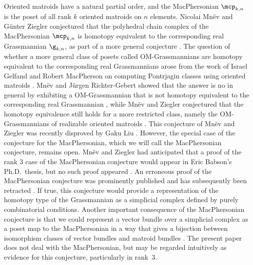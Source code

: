 Oriented matroids have a natural partial order, and the MacPhersonian $\mcp_{k,n}$ is the poset of all rank $k$ oriented matroids on $n$ elements.
Nicolai Mnëv and Günter Ziegler conjectured that the polyhedral chain complex of the MacPhersonian $\mcp_{k,n}$ is homotopy equivalent to the corresponding real Grassmannian $\g_{k,n}$, as part of a more general conjecture \cite{mnev1993combinatorial}.
The question of whether a more general class of posets called OM-Grassmannians are homotopy equivalent to the corresponding real Grassmannians
arose from the work of Israel Gelfand and Robert MacPherson on computing Pontrjagin classes using oriented matroids \cite{gelfand1992combinatorial}.
Mnëv and Jürgen Richter-Gebert showed that the answer is no in general by exhibiting a OM-Grassmannian that is not homotopy equivalent to the corresponding real Grassmannian \cite{mnev1993two}, while
Mnëv and Ziegler conjectured that the homotopy equivalence still holds for a more restricted class, namely the OM-Grassmannians of realizable oriented matroids \cite{mnev1993combinatorial}.
This conjecture of Mnëv and Ziegler was recently
disproved by Gaku Liu \cite{liu2020counterexample}.
However, the special case of the conjecture for the MacPhersonian, which we will call the MacPhersonian conjecture, remains open.
Mnëv and Ziegler had anticipated that a proof of the rank $3$ case of the MacPhersonian conjecture would appear in Eric Babson's Ph.D.\ thesis, but no such proof appeared \cite{mnev1993combinatorial,babson1993combinatorial}.
An erroneous proof of the MacPhersonian conjecture was prominently published and has subsequently been retracted \cite{biss2003homotopy,biss2009erratum}.
If true, this conjecture would provide a representation of the homotopy type of the Grassmannian as a simplicial complex defined by purely combinatorial conditions.
Another important consequence of the MacPhersonian conjecture is that we could represent a vector bundle over a simplicial complex as a poset map to the MacPhersonian in a way that gives a bijection between isomorphism classes of vector bundles and matroid bundles \cite{anderson2002mod,anderson1999matroid}.
The present paper does not deal with the MacPhersonian, but may be regarded intuitively as evidence for this conjecture, particularly in rank~$3$.

